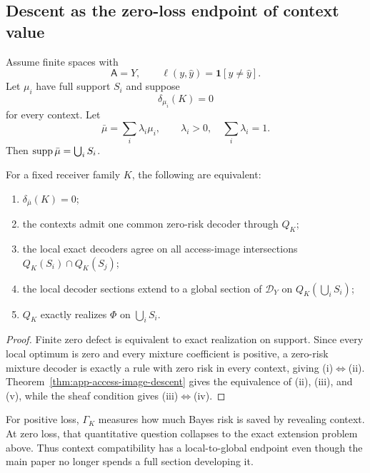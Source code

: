 \subsection{Descent as the zero-loss endpoint of context value}

Assume finite spaces with
\[
\mathsf A=Y,
\qquad
\ell(y,\hat y)=\mathbf1[y\neq\hat y].
\]
Let $\mu_i$ have full support $S_i$ and suppose
\[
\delta_{\mu_i}(K)=0
\]
for every context. Let
\[
\bar\mu
=
\sum_i\lambda_i\mu_i,
\qquad
\lambda_i>0,
\quad
\sum_i\lambda_i=1.
\]
Then $\operatorname{supp}\bar\mu=\bigcup_iS_i$.

\begin{corollary}
\label{cor:app-descent-zero-contextuality}
For a fixed receiver family $K$, the following are equivalent:
\begin{enumerate}[label=(\roman*)]
\item $\delta_{\bar\mu}(K)=0$;
\item the contexts admit one common zero-risk decoder through $Q_K$;
\item the local exact decoders agree on all access-image intersections $Q_K(S_i)\cap Q_K(S_j)$;
\item the local decoder sections extend to a global section of $\mathscr D_Y$ on $Q_K(\bigcup_iS_i)$;
\item $Q_K$ exactly realizes $\Phi$ on $\bigcup_iS_i$.
\end{enumerate}
\end{corollary}

\begin{proof}
Finite zero defect is equivalent to exact realization on support. Since every local optimum is zero and every mixture coefficient is positive, a zero-risk mixture decoder is exactly a rule with zero risk in every context, giving (i)$\Leftrightarrow$(ii). Theorem~\ref{thm:app-access-image-descent} gives the equivalence of (ii), (iii), and (v), while the sheaf condition gives (iii)$\Leftrightarrow$(iv).
\end{proof}

For positive loss, $\Gamma_K$ measures how much Bayes risk is saved by revealing context. At zero loss, that quantitative question collapses to the exact extension problem above. Thus context compatibility has a local-to-global endpoint even though the main paper no longer spends a full section developing it.
